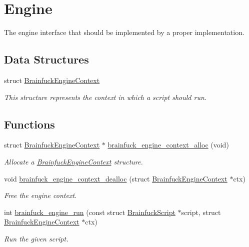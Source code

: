 \hypertarget{group__engine}{}\section{Engine}
\label{group__engine}


The engine interface that should be implemented by a proper implementation.  


\subsection*{Data Structures}
\begin{DoxyCompactItemize}
\item 
struct \hyperlink{structBrainfuckEngineContext}{Brainfuck\+Engine\+Context}
\begin{DoxyCompactList}\small\item\em This structure represents the context in which a script should run. \end{DoxyCompactList}\end{DoxyCompactItemize}
\subsection*{Functions}
\begin{DoxyCompactItemize}
\item 
struct \hyperlink{structBrainfuckEngineContext}{Brainfuck\+Engine\+Context} $\ast$ \hyperlink{group__engine_ga87ed292811cb43ff8c0b76aa7d245547}{brainfuck\+\_\+engine\+\_\+context\+\_\+alloc} (void)
\begin{DoxyCompactList}\small\item\em Allocate a \hyperlink{structBrainfuckEngineContext}{Brainfuck\+Engine\+Context} structure. \end{DoxyCompactList}\item 
void \hyperlink{group__engine_gacf18fa3a3ca4bb658af020d3830536d9}{brainfuck\+\_\+engine\+\_\+context\+\_\+dealloc} (struct \hyperlink{structBrainfuckEngineContext}{Brainfuck\+Engine\+Context} $\ast$ctx)
\begin{DoxyCompactList}\small\item\em Free the engine context. \end{DoxyCompactList}\item 
int \hyperlink{group__engine_ga3f091c103cba588d968c6b0312a4b20a}{brainfuck\+\_\+engine\+\_\+run} (const struct \hyperlink{group__ast_ga9084bd8dcac602fdcbf7ca845b1e1b20}{Brainfuck\+Script} $\ast$script, struct \hyperlink{structBrainfuckEngineContext}{Brainfuck\+Engine\+Context} $\ast$ctx)
\begin{DoxyCompactList}\small\item\em Run the given script. \end{DoxyCompactList}\end{DoxyCompactItemize}


